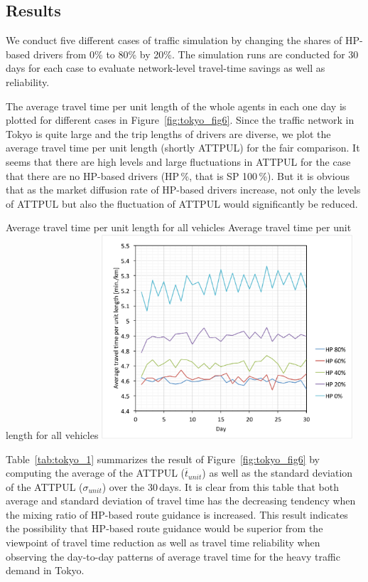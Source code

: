 \subsection{Results}
We conduct five different cases of traffic simulation by changing the shares of HP-based drivers from 0\% to 80\% by 20\%. The simulation runs are conducted for 30\,days for each case to evaluate network-level travel-time savings as well as reliability. 

The average travel time per unit length of the whole agents in each one day is plotted for different cases in Figure~\ref{fig:tokyo_fig6}. Since the traffic network in Tokyo is quite large and the trip lengths of drivers are diverse, we plot the average travel time per unit length (shortly ATTPUL) for the fair comparison. It seems that there are high levels and large fluctuations in ATTPUL for the case that there are no HP-based drivers (HP\,\%, that is SP 100\,\%). But it is obvious that as the market diffusion rate of HP-based drivers increase, not only the levels of ATTPUL but also the fluctuation of ATTPUL would significantly be reduced.


\createfigure%
{Average travel time per unit length for all vehicles}%
{Average travel time per unit length for all vehicles}%
{\label{fig:tokyo_fig6}}%
{\includegraphics[width=0.70\textwidth, angle=0]{./scenarios/figures/tokyo_fig6.pdf}}%
{}


Table~\ref{tab:tokyo_1} summarizes the result of Figure~\ref{fig:tokyo_fig6} by computing the average of the ATTPUL ($\overline{t}_{unit}$) as well as the standard deviation of the ATTPUL ($\sigma_{unit}$) over the 30\,days. It is clear from this table that both average and standard deviation of travel time has the decreasing tendency when the mixing ratio of HP-based route guidance is increased. This result indicates the possibility that HP-based route guidance would be superior from the viewpoint of travel time reduction as well as travel time reliability when observing the day-to-day patterns of average travel time for the heavy traffic demand in Tokyo. 

